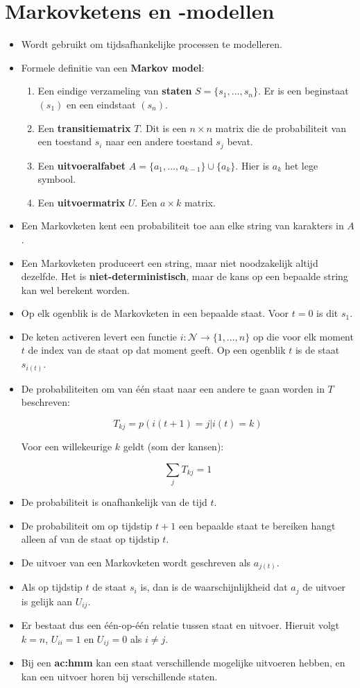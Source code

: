 \section{Markovketens en -modellen}
\begin{itemize}
	\item Wordt gebruikt om tijdsafhankelijke processen te modelleren. 
	\item Formele definitie van een \textbf{Markov model}:
	\begin{enumerate}
		\item Een eindige verzameling van \textbf{staten} $S = \{s_1, ..., s_n\}$. Er is een beginstaat $(s_1)$ en een eindstaat $(s_n)$.
		\item Een \textbf{transitiematrix} $T$. Dit is een $n \times n$ matrix die de probabiliteit van een toestand $s_i$ naar een andere toestand $s_j$ bevat.
		\item Een \textbf{uitvoeralfabet} $A = \{a_1, ..., a_{k - 1}\} \cup \{a_k\}$. Hier is $a_k$ het lege symbool.
		\item Een \textbf{uitvoermatrix} $U$. Een $a \times k$ matrix.
	\end{enumerate}
	\item Een Markovketen kent een probabiliteit toe aan elke string van karakters in $A$. 
	\item Een Markovketen produceert een string, maar niet noodzakelijk altijd dezelfde. Het is \textbf{niet-deterministisch}, maar de kans op een bepaalde string kan wel berekent worden.
	\item Op elk ogenblik is de Markovketen in een bepaalde staat. Voor $t = 0$ is dit $s_1$.
	\item De keten activeren levert een functie $i : \mathcal{N} \rightarrow \{1, ..., n\}$ op die voor elk moment $t$ de index van de staat op dat moment geeft. Op een ogenblik $t$ is de staat $s_{i(t)}$.
	\item De probabiliteiten om van één staat naar een andere te gaan worden in $T$ beschreven:
	
	$$T_{kj} = p(i(t + 1) = j|i(t) = k)$$
	
	Voor een willekeurige $k$ geldt (som der kansen):
	
	$$\sum_j T_{kj} = 1$$
	
	\item De probabiliteit is onafhankelijk van de tijd $t$.
	\item De probabiliteit om op tijdstip $t + 1$ een bepaalde staat te bereiken hangt alleen af van de staat op tijdstip $t$.
	\item De uitvoer van een Markovketen wordt geschreven als $a_{j(t)}$. 
	\item Als op tijdstip $t$ de staat $s_i$ is, dan is de waarschijnlijkheid dat $a_j$ de uitvoer is gelijk aan $U_{ij}$.
	\item Er bestaat dus een één-op-één relatie tussen staat en uitvoer. Hieruit volgt $k = n$, $U_{ii} = 1$ en $U_{ij} = 0$ als $i \neq j$.
	\item Bij een \textbf{\gls{ac:hmm}} kan een staat verschillende mogelijke uitvoeren hebben, en kan een uitvoer horen bij verschillende staten.
	

\end{itemize}
